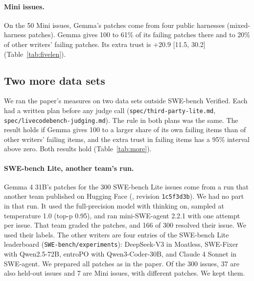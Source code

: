\documentclass[10pt,letterpaper]{article}
\begin{document}
\paragraph{Mini issues.} On the 50 Mini issues, Gemma's patches come from four public harnesses (mixed-harness
patches). Gemma gives 100 to 61\% of its failing patches there and to 20\% of other writers' failing patches. Its
extra trust is $+20.9$ [11.5, 30.2] (Table~\ref{tab:fivelen}).

\subsection*{Two more data sets}

We ran the paper's measures on two data sets outside SWE-bench Verified. Each had a written plan before any judge call
(\texttt{spec/third-party-lite.md}, \texttt{spec/livecodebench-judging.md}). The rule in both plans was the same. The
result holds if Gemma gives 100 to a larger share of its own failing items than of other writers' failing items, and
the extra trust in failing items has a 95\% interval above zero. Both results hold (Table~\ref{tab:more}).

\paragraph{SWE-bench Lite, another team's run.} Gemma 4 31B's patches for the 300 SWE-bench Lite issues come from a
run that another team published on Hugging Face (, %
revision \texttt{1c5f3d3b}). We had no part in that run. It used the full-precision model with thinking on, sampled at
temperature 1.0 (top-p 0.95), and ran mini-SWE-agent 2.2.1 with one attempt per issue. That team graded the patches,
and 166 of 300 resolved their issue. We used their labels. The other writers are four entries of the SWE-bench Lite
leaderboard (\texttt{SWE-bench/experiments}): DeepSeek-V3 in Moatless, SWE-Fixer with Qwen2.5-72B, entroPO with
Qwen3-Coder-30B, and Claude 4 Sonnet in SWE-agent. We prepared all patches as in the paper. Of the 300 issues, 37 are
also held-out issues and 7 are Mini issues, with different patches. We kept them.
\end{document}
